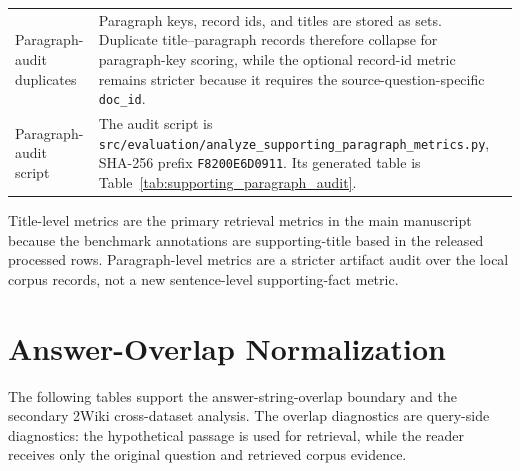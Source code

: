 \documentclass[pdflatex,sn-basic,Numbered]{sn-jnl}
\begin{document}
\begin{table}[t]
\begin{threeparttable}
\begin{tabularx}{\textwidth}{>{\raggedright\arraybackslash}p{}
                            >{\raggedright\arraybackslash}X}
Paragraph-audit duplicates & Paragraph keys, record ids, and titles are stored as sets. Duplicate title--paragraph records therefore collapse for paragraph-key scoring, while the optional record-id metric remains stricter because it requires the source-question-specific \texttt{doc\_id}. \\
Paragraph-audit script & The audit script is \texttt{src/evaluation/analyze\_supporting\_paragraph\_metrics.py}, SHA-256 prefix \texttt{F8200E6D0911}. Its generated table is Table~\ref{tab:supporting_paragraph_audit}. \\
\bottomrule
\end{tabularx}
\begin{tablenotes}
\footnotesize
\item Title-level metrics are the primary retrieval metrics in the main manuscript because the benchmark annotations are supporting-title based in the released processed rows. Paragraph-level metrics are a stricter artifact audit over the local corpus records, not a new sentence-level supporting-fact metric.
\end{tablenotes}
\end{threeparttable}
\end{table}

\FloatBarrier
\section{Answer-Overlap Normalization}
\label{sec:supp_answer_overlap_normalization}

The following tables support the answer-string-overlap boundary and the secondary 2Wiki cross-dataset analysis. The overlap diagnostics are query-side diagnostics: the hypothetical passage is used for retrieval, while the reader receives only the original question and retrieved corpus evidence.
\end{document}
